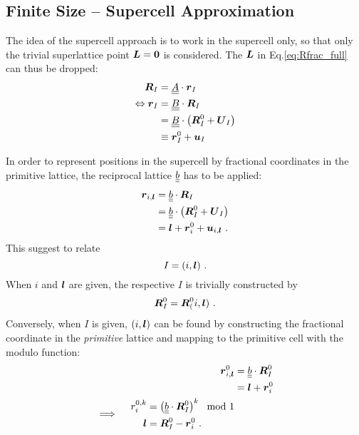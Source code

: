 \subsection{Finite Size -- Supercell Approximation}

The idea of the supercell approach is to work in the supercell only, so that 
only the trivial superlattice point $\boldsymbol{L} = \boldsymbol{0}$ is considered. The $\boldsymbol{L}$ in 
Eq.\:\ref{eq:Rfrac_full} can thus be dropped:
\begin{subequations}
	\begin{align}
	\boldsymbol{R}_I &= \underline{\underline{{A}}} \cdot \boldsymbol{r}_I \\
	\Leftrightarrow \boldsymbol{r}_I &= \underline{\underline{{B}}} \cdot \boldsymbol{R}_I \\
	&= \underline{\underline{{B}}} \cdot \left(\boldsymbol{R}^0_{I} +  \boldsymbol{U}_{I}\right) \\
	&\equiv \boldsymbol{r}_I^0 + \boldsymbol{u}_{I}~
	\label{eq:Rfrac}
	\end{align}
\end{subequations}

\nid In order to represent positions in the supercell by fractional coordinates 
in the primitive lattice, the reciprocal lattice $\underline{\underline{{b}}}$ has to be 
applied:
\begin{align*}
	\boldsymbol{r}_{i, \boldsymbol{l}} &= \underline{\underline{{b}}} \cdot \boldsymbol{R}_{I} \\
	&= \underline{\underline{{b}}} \cdot \left(\boldsymbol{R}^0_{I} +  \boldsymbol{U}_{I}\right) \\
	&= \boldsymbol{l} + \boldsymbol{r}^0_{i} + \boldsymbol{u}_{i, \boldsymbol{l}}~.
\end{align*}
This suggest to relate
$$ I = (i, \boldsymbol{l})~. $$
When $i$ and $\boldsymbol{l}$ are given, the respective $I$ is trivially constructed by
\begin{align}
	\boldsymbol{R}^0_I = \boldsymbol{R}^0_(i, \boldsymbol{l})~.
\end{align}
Conversely, when $I$ is given, $(i, \boldsymbol{l})$ can be found by constructing the 
fractional coordinate in the \emph{primitive} lattice and mapping to the 
primitive cell with the modulo function:
\begin{align}
	\boldsymbol{r}^0_{i, \boldsymbol{l}} &= \underline{\underline{{b}}} \cdot \boldsymbol{R}^0_{I} \\
	&= \boldsymbol{l} + \boldsymbol{r}^0_{i} \\
	\implies \quad
	\begin{split}
	r^{0, k}_{i} &= \left( \underline{\underline{{b}}} \cdot \boldsymbol{R}^0_{I} \right)^k \mod{1} \\
	\boldsymbol{l} &= \boldsymbol{R}^0_{I} - \boldsymbol{r}^{0}_{i}~.
	\end{split}
\end{align}

